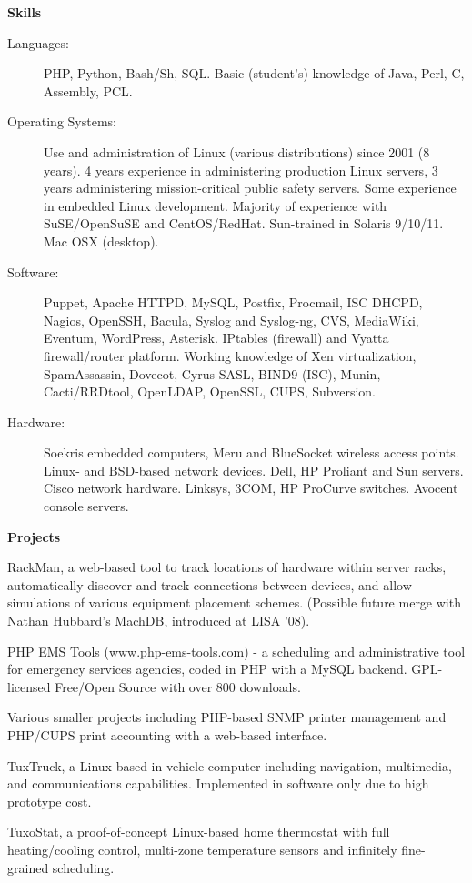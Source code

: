 \documentclass[letterpaper,11pt]{article}
\newcommand{\resheading}[1]{{\large \colorbox{mygrey}{\begin{minipage}{\textwidth}{\textbf{#1 \vphantom{p\^{E}}}}\end{minipage}}}}
\begin{document}
\resheading{Skills}

\begin{description}
\item[Languages:]
PHP, Python, Bash/Sh, SQL. Basic (student's) knowledge of Java, Perl, C, Assembly,
PCL. 
\item[Operating Systems:]
Use and administration of Linux (various distributions) since 2001 (8
years). 4 years experience in administering production Linux servers, 3 years
administering mission-critical public safety servers. Some experience in embedded
Linux development. Majority of experience with SuSE/OpenSuSE and CentOS/RedHat.
Sun-trained in Solaris 9/10/11. Mac OSX (desktop). 
\item[Software:]
Puppet, Apache HTTPD, MySQL, Postfix, Procmail, ISC DHCPD, Nagios, OpenSSH, Bacula,
Syslog and Syslog-ng, CVS, MediaWiki, Eventum, WordPress, Asterisk. IPtables (firewall)
and Vyatta firewall/router platform. Working knowledge of Xen virtualization,
SpamAssassin, Dovecot, Cyrus SASL, BIND9 (ISC), Munin, Cacti/RRDtool,
OpenLDAP, OpenSSL, CUPS, Subversion.
\item[Hardware:]
Soekris embedded computers, Meru and BlueSocket wireless access points. Linux-
and BSD-based network devices. Dell,
HP Proliant and Sun servers. Cisco network hardware. Linksys, 3COM, HP
ProCurve switches. Avocent console servers.
\end{description}

\resheading{Projects}

\begin{description}
\item[In Progress] RackMan, a web-based tool to track locations of hardware
  within server racks, automatically discover and track connections between
  devices, and allow simulations of various equipment placement
  schemes. (Possible future merge with Nathan Hubbard's MachDB, introduced at
  LISA '08).
\item[2007--Present] PHP EMS Tools (www.php-ems-tools.com) - a scheduling and
  administrative tool for emergency services agencies, coded in PHP with a MySQL
  backend. GPL-licensed Free/Open Source with over 800 downloads.
\item Various smaller projects including PHP-based SNMP printer management and
PHP/CUPS print accounting with a web-based interface.
\item TuxTruck, a Linux-based in-vehicle computer including navigation,
  multimedia, and communications capabilities. Implemented in software only
  due to high prototype cost.
\item TuxoStat, a proof-of-concept Linux-based home thermostat with full
  heating/cooling control, multi-zone temperature sensors and infinitely
  fine-grained scheduling.
\end{description}
\end{document}
